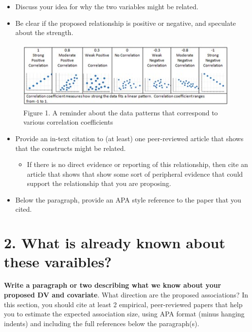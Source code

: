 \documentclass[
]{book}
\providecommand{\tightlist}{%
  \setlength{\itemsep}{0pt}\setlength{\parskip}{0pt}}
\begin{document}
\begin{itemize}
\tightlist
\item
  Discuss your idea for why the two variables might be related.
\item
  Be clear if the proposed relationship is positive or negative, and speculate about the strength.
\end{itemize}

\begin{figure}
\centering
\includegraphics{Figs/strength.jpg}
\caption{\label{fig:unnamed-chunk-9}Figure 1. A reminder about the data patterns that correspond to various correlation coefficients}
\end{figure}

\begin{itemize}
\tightlist
\item
  Provide an in-text citation to (at least) one peer-reviewed article that shows that the constructs might be related.

  \begin{itemize}
  \tightlist
  \item
    If there is no direct evidence or reporting of this relationship, then cite an article that shows that show some sort of peripheral evidence that could support the relationship that you are proposing.
  \end{itemize}
\item
  Below the paragraph, provide an APA style reference to the paper that you cited.
\end{itemize}

\section*{2. What is already known about these varaibles?}\label{what-is-already-known-about-these-varaibles}

\textbf{Write a paragraph or two describing what we know about your proposed DV and covariate}. What direction are the proposed associations? In this section, you should cite at least 2 empirical, peer-reviewed papers that help you to estimate the expected association size, using APA format (minus hanging indents) and including the full references below the paragraph(s).
\end{document}
